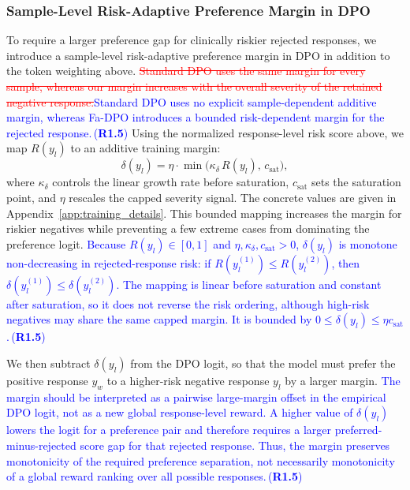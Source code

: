 \documentclass[a4paper,fleqn,doubleblind]{cas-sc}
\DeclareRobustCommand{\deleted}[1]{\textcolor{red}{\sout{#1}}}
\DeclareRobustCommand{\added}[1]{\textcolor{blue}{#1}}
\DeclareRobustCommand{\revtag}[1]{\textcolor{blue}{\scriptsize\,(\textbf{#1})}}
\begin{document}
\subsubsection{Sample-Level Risk-Adaptive Preference Margin in DPO}
\label{sec:sample_margin}
To require a larger preference gap for clinically riskier rejected responses, we introduce a sample-level risk-adaptive preference margin in DPO in addition to the token weighting above. \deleted{Standard DPO uses the same margin for every sample, whereas our margin increases with the overall severity of the retained negative response.}\added{Standard DPO uses no explicit sample-dependent additive margin, whereas Fa-DPO introduces a bounded risk-dependent margin for the rejected response.}\revtag{R1.5} Using the normalized response-level risk score above, we map $R(y_l)$ to an additive training margin:
\begin{equation}
\label{eq:severity_margin}
\delta(y_l)=\eta \cdot \min \big( \kappa_{\delta} \, R(y_l), \, c_{\text{sat}} \big),
\end{equation}
where $\kappa_{\delta}$ controls the linear growth rate before saturation, $c_{\text{sat}}$ sets the saturation point, and $\eta$ rescales the capped severity signal. The concrete values are given in Appendix~\ref{app:training_details}. This bounded mapping increases the margin for riskier negatives while preventing a few extreme cases from dominating the preference logit.
\added{Because $R(y_l)\in[0,1]$ and $\eta,\kappa_{\delta},c_{\text{sat}}>0$, $\delta(y_l)$ is monotone non-decreasing in rejected-response risk: if $R(y_l^{(1)})\le R(y_l^{(2)})$, then $\delta(y_l^{(1)})\le\delta(y_l^{(2)})$. The mapping is linear before saturation and constant after saturation, so it does not reverse the risk ordering, although high-risk negatives may share the same capped margin. It is bounded by $0\le\delta(y_l)\le\eta c_{\text{sat}}$.}\revtag{R1.5}

We then subtract $\delta(y_l)$ from the DPO logit, so that the model must prefer the positive response $y_w$ to a higher-risk negative response $y_l$ by a larger margin.
\added{The margin should be interpreted as a pairwise large-margin offset in the empirical DPO logit, not as a new global response-level reward. A higher value of $\delta(y_l)$ lowers the logit for a preference pair and therefore requires a larger preferred-minus-rejected score gap for that rejected response. Thus, the margin preserves monotonicity of the required preference separation, not necessarily monotonicity of a global reward ranking over all possible responses.}\revtag{R1.5}
\end{document}
